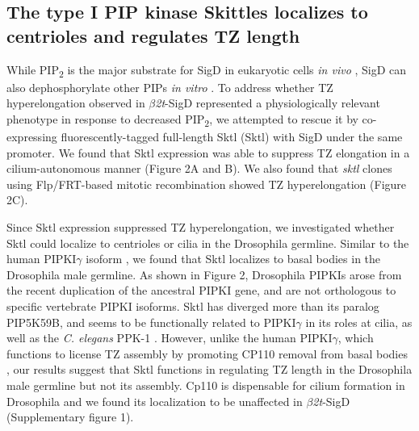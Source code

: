 \documentclass[12pt, twoside, letterpaper]{article}
\newcommand{\PIP}{PIP\textsubscript{2}}
\newcommand{\sigd}{$\beta$\textit{2t}-SigD}
\begin{document}
\begin{doublespacing}
\begin{linenumbers}
    \subsection{The type I PIP kinase Skittles localizes to centrioles and regulates TZ length}
    While \PIP{} is the major substrate for SigD in eukaryotic cells \textit{in vivo}
    \citep{terebiznik2002elimination, zhou2001salmonella, sengupta2013depletion},
    SigD can also dephosphorylate other PIPs \textit{in vitro}
    \citep{norris1998sopb}.
    To address whether TZ hyperelongation observed in \sigd{} represented a
    physiologically relevant phenotype in response to decreased \PIP{},
    we attempted to rescue it by
    co-expressing fluorescently-tagged full-length Sktl (Sktl) with SigD
    under the same promoter.
    We found that Sktl expression was able to suppress TZ elongation
    in a cilium-autonomous manner (Figure 2A and B).
    We also found that \textit{sktl} clones using Flp/FRT-based mitotic recombination
    showed TZ hyperelongation (Figure 2C).

    Since Sktl expression suppressed TZ hyperelongation,
    we investigated whether Sktl could localize to centrioles or cilia
    in the Drosophila germline.
    Similar to the human PIPKI$\gamma$ isoform \citep{xu2014pipkigamma},
    we found that Sktl localizes to basal bodies in the Drosophila male germline.
    As shown in Figure 2, Drosophila PIPKIs arose from the recent duplication of
    the ancestral PIPKI gene,
    and are not orthologous to specific vertebrate PIPKI isoforms.
    Sktl has diverged more than its paralog PIP5K59B, and seems
    to be functionally related to PIPKI$\gamma$ in its roles at cilia,
    as well as the \textit{C. elegans} PPK-1 \citep{xu2014pipkigamma}.
    However, unlike the human PIPKI$\gamma$, which functions to license TZ assembly
    by promoting CP110 removal from basal bodies \citep{xu2016phosphatidylinositol},
    our results suggest that Sktl functions in
    regulating TZ length in the Drosophila male germline
    but not its assembly.
    Cp110 is dispensable for cilium formation in Drosophila \citep{franz2013cp110}
    and we found its localization to be unaffected in \sigd{} (Supplementary figure 1).


\end{linenumbers}
\end{doublespacing}
\end{document}

